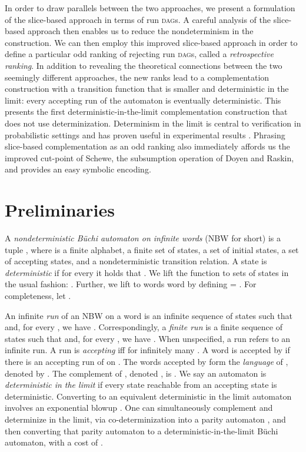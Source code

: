 \documentclass{LMCS}
\newcommand\hide[1]{}
\newcommand\kahler{K\"ahler\xspace}
\newcommand\buchi{B\"uchi\xspace}
\newcommand{\DAGs}{\textsc{dag}s\xspace}
\begin{document}
In order to draw parallels between the two approaches, we present a formulation of the slice-based
approach \hide{of \kahler and Wilke} in terms of run \DAGs. A careful analysis of the slice-based
approach then enables us to reduce the nondeterminism in the construction.  We can then employ this
improved slice-based approach in order to define a particular odd ranking of rejecting run \DAGs,
called a {\em retrospective ranking}.  In addition to revealing the theoretical connections between
the two seemingly different approaches, the new ranks lead to a complementation construction with a
transition function that is smaller and deterministic in the limit: every accepting run of the
automaton is eventually deterministic. This presents the first 
deterministic-in-the-limit complementation construction that does not use determinization.  Determinism in the limit
is central to verification in probabilistic settings \cite{CY95} and has proven useful in
experimental results \cite{ST03}.  Phrasing slice-based complementation as an odd ranking also
immediately affords us the improved cut-point of Schewe, the subsumption operation of Doyen and
Raskin, and provides an easy symbolic encoding.


\section{Preliminaries}\label{Sect:Ranks}\label{Sect:Tight}



A \emph{nondeterministic \buchi automaton on infinite words} (NBW for short) is a tuple , where  is a finite alphabet,  a finite set of states,  a set of initial states,  a set of accepting states, and  a nondeterministic transition relation. A state  is {\em
deterministic} if for every  it holds that . We lift
the function  to sets  of states in the usual fashion: . Further, we lift  to words word  by defining
 = . For
completeness, let .

\cbstart An infinite {\em run} of an NBW  on a word 
is an infinite sequence of states  such that  and, for
every , we have . Correspondingly, a \emph{finite run} is a
finite sequence of states  such that  and, for every , we have . When unspecified, a run refers to an infinite run. 
\cbend  A run is \emph{accepting} iff  for infinitely many .  A word  is accepted by  if there is an accepting run of  on .  The words accepted
by  form the {\em language} of , denoted by . The complement of , denoted
, is .  We say an automaton is \emph{deterministic
in the limit} if every state reachable from an accepting state is deterministic. Converting  to
an equivalent deterministic in the limit automaton involves an exponential blowup \cite{CY95,Saf88}.
One can simultaneously complement and determinize in the limit, via co-determinization into a parity
automaton \cite{Pit06}, and then converting that parity automaton to a deterministic-in-the-limit
\buchi automaton, with a cost of . 
\end{document}
